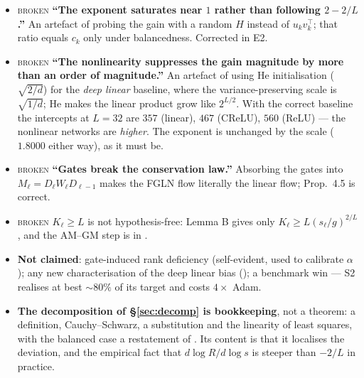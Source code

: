 \documentclass{article}
\newcommand{\NO}{{\color{red!75!black}\textsc{broken}}}
\theoremstyle{plain}\newtheorem{theorem}{Theorem}\newtheorem{lemma}[theorem]{Lemma}
\theoremstyle{definition}\newtheorem{definition}[theorem]{Definition}
\begin{document}
\begin{itemize}[leftmargin=*,itemsep=2pt]
  \item \NO{} \textbf{``The exponent saturates near $1$ rather than following $2-2/L$.''}
        An artefact of probing the gain with a random $H$ instead of $u_kv_k^\top$; that ratio
        equals $c_k$ only under balancedness. Corrected in E2.
  \item \NO{} \textbf{``The nonlinearity suppresses the gain magnitude by more than an order of
        magnitude.''} An artefact of using He initialisation ($\sqrt{2/d}$) for the \emph{deep
        linear} baseline, where the variance-preserving scale is $\sqrt{1/d}$; He makes the linear
        product grow like $2^{L/2}$. With the correct baseline the intercepts at $L{=}32$ are
        $357$ (linear), $467$ (CReLU), $560$ (ReLU) --- the nonlinear networks are \emph{higher}.
        The exponent is unchanged by the scale ($1.8000$ either way), as it must be.
  \item \NO{} \textbf{``Gates break the conservation law.''} Absorbing the gates into
        $M_\ell=D_\ell W_\ell D_{\ell-1}$ makes the FGLN flow literally the linear flow;
        \cite{haas2026why} Prop.~4.5 is correct.
  \item \NO{} $K_\ell\ge L$ is not hypothesis-free: Lemma B gives only
        $K_\ell\ge L(s_\ell/g)^{2/L}$, and the AM--GM step is in \cite{rawal2026saddle}.
  \item \textbf{Not claimed}: gate-induced rank deficiency (self-evident, used to calibrate
        $\alpha$); any new characterisation of the deep linear bias
        (\cite{arora2018optimization}); a benchmark win --- S2 realises at best ${\sim}80\%$ of its
        target and costs $4\times$ Adam.
  \item \textbf{The decomposition of \S\ref{sec:decomp} is bookkeeping}, not a theorem: a
        definition, Cauchy--Schwarz, a substitution and the linearity of least squares, with the
        balanced case a restatement of \cite{arora2018optimization}. Its content is that it
        localises the deviation, and the empirical fact that $d\log R/d\log s$ is steeper than
        $-2/L$ in practice.
\end{itemize}

\end{document}
